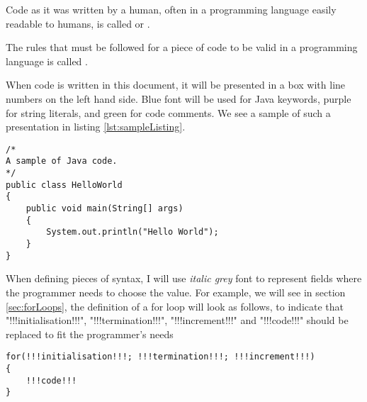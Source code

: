 \documentclass[11pt]{report}
\begin{document}
\begin{defi}
    Code as it was written by a human, often in a programming language easily readable to humans, is called  or .
\end{defi}
\begin{defi}[Syntax]
    The rules that must be followed for a piece of code to be valid in a programming language is called .
\end{defi}
\noindent When code is written in this document, it will be presented in a box with line numbers on the left hand side. {\color{blue} Blue} font will be used for Java keywords, {\color{mymauve} purple} for string literals, and {\color{mygreen} green} for code comments. We see a sample of such a presentation in listing \ref{lst:sampleListing}.
\begin{lstlisting}[caption=A sample of code, label=lst:sampleListing]
/*
A sample of Java code.
*/
public class HelloWorld
{
    public void main(String[] args)
    {
        System.out.println("Hello World");
    }
} 
\end{lstlisting}
When defining pieces of syntax, I will use {\slshape\color{mygray} italic grey} font to represent fields where the programmer needs to choose the value. For example, we will see in section \ref{sec:forLoops}, the definition of a for loop will look as follows, to indicate that \inlineJava"!!!initialisation!!!", \inlineJava"!!!termination!!!", \inlineJava"!!!increment!!!" and \inlineJava"!!!code!!!" should be replaced to fit the programmer's needs
\vspace{-20pt}
\begin{lstlisting}[style=javaSyntax]
for(!!!initialisation!!!; !!!termination!!!; !!!increment!!!)
{
    !!!code!!!
}
\end{lstlisting}
\end{document}

